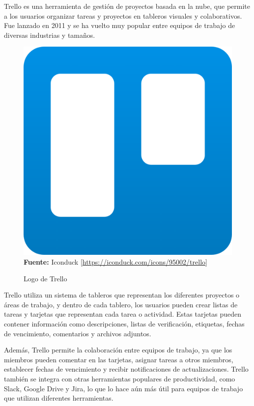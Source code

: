 Trello es una herramienta de gestión de proyectos basada en la nube, que
permite a los usuarios organizar tareas y proyectos en tableros visuales y
colaborativos. Fue lanzado en 2011 y se ha vuelto muy popular entre equipos de
trabajo de diversas industrias y tamaños.
\begin{figure}[htb!]
    \centering
    \caption{Logo de Trello}
    \label{fig:trello-logo}
    \centering
    \includegraphics[scale=0.05]{./Ilustraciones/logos/trello.1024x1024.png}\\
    \textbf{Fuente:} Iconduck [\url{https://iconduck.com/icons/95002/trello}]
\end{figure}
\hfill \break
Trello utiliza un sistema de tableros que representan los diferentes proyectos
o áreas de trabajo, y dentro de cada tablero, los usuarios pueden crear listas
de tareas y tarjetas que representan cada tarea o actividad. Estas tarjetas
pueden contener información como descripciones, listas de verificación,
etiquetas, fechas de vencimiento, comentarios y archivos adjuntos.

Además, Trello permite la colaboración entre equipos de trabajo, ya que los
miembros pueden comentar en las tarjetas, asignar tareas a otros miembros,
establecer fechas de vencimiento y recibir notificaciones de actualizaciones.
Trello también se integra con otras herramientas populares de productividad,
como Slack, Google Drive y Jira, lo que lo hace aún más útil para equipos de
trabajo que utilizan diferentes herramientas.